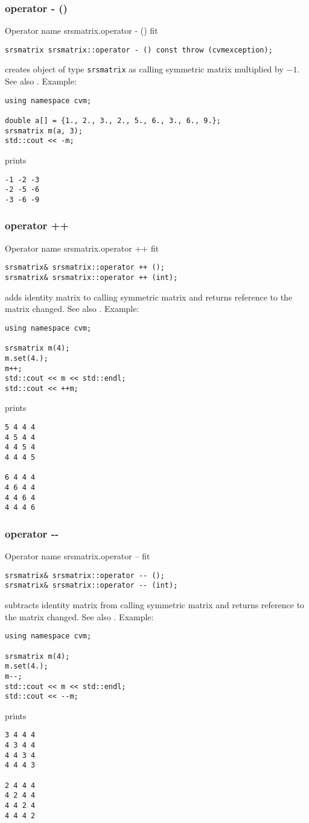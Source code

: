 \subsubsection{operator - ()}
Operator%
\pdfdest name {srsmatrix.operator - ()} fit
\begin{verbatim}
srsmatrix srsmatrix::operator - () const throw (cvmexception);
\end{verbatim}
creates  object of type \verb"srsmatrix" as
 calling symmetric matrix multiplied by $-1$.
See also .
Example:
\begin{Verbatim}
using namespace cvm;

double a[] = {1., 2., 3., 2., 5., 6., 3., 6., 9.};
srsmatrix m(a, 3);
std::cout << -m;
\end{Verbatim}
prints
\begin{Verbatim}
-1 -2 -3
-2 -5 -6
-3 -6 -9
\end{Verbatim}
\newpage



\subsubsection{operator ++}
Operator%
\pdfdest name {srsmatrix.operator ++} fit
\begin{verbatim}
srsmatrix& srsmatrix::operator ++ ();
srsmatrix& srsmatrix::operator ++ (int);
\end{verbatim}
adds identity matrix to  calling symmetric matrix
and returns  reference to
the matrix changed.
See also .
Example:
\begin{Verbatim}
using namespace cvm;

srsmatrix m(4);
m.set(4.);
m++;
std::cout << m << std::endl;
std::cout << ++m;
\end{Verbatim}
prints
\begin{Verbatim}
5 4 4 4
4 5 4 4
4 4 5 4
4 4 4 5

6 4 4 4
4 6 4 4
4 4 6 4
4 4 4 6
\end{Verbatim}
\newpage



\subsubsection{operator -{}-}
Operator%
\pdfdest name {srsmatrix.operator --} fit
\begin{verbatim}
srsmatrix& srsmatrix::operator -- ();
srsmatrix& srsmatrix::operator -- (int);
\end{verbatim}
subtracts identity matrix from  calling symmetric matrix
and returns  reference to
the matrix changed.
See also .
Example:
\begin{Verbatim}
using namespace cvm;

srsmatrix m(4);
m.set(4.);
m--;
std::cout << m << std::endl;
std::cout << --m;
\end{Verbatim}
prints
\begin{Verbatim}
3 4 4 4
4 3 4 4
4 4 3 4
4 4 4 3

2 4 4 4
4 2 4 4
4 4 2 4
4 4 4 2
\end{Verbatim}
\newpage



